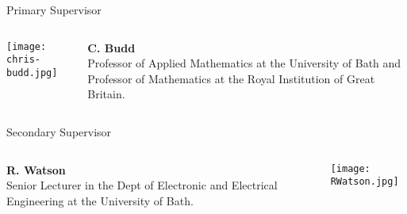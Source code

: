\documentclass[final]{beamer}
\theoremstyle{plain}
\theoremstyle{definition}
\theoremstyle{remark}
\newlength{\onecolwid}
\begin{document}
\begin{frame}[t]
\begin{columns}[t]
\begin{column}{\onecolwid}
\begin{block}{Primary Supervisor}
\vspace{-2cm}
\begin{columns}
\begin{column}{0.25\linewidth}
\texttt{[image: chris-budd.jpg]}
\end{column}
\begin{column}{0.75\linewidth}
\textbf{C. Budd}
 \\
Professor of Applied Mathematics at the University of Bath and Professor of Mathematics at the Royal Institution of Great Britain. \\
\end{column}
\end{columns}
\end{block}

\begin{alertblock}{Secondary Supervisor}
\begin{columns}
\begin{column}{0.75\linewidth}
\textbf{R. Watson}
 \\
Senior Lecturer in the Dept of Electronic and Electrical Engineering at the University of Bath. \\
\end{column}
\begin{column}{0.25\linewidth}
\texttt{[image: RWatson.jpg]}
\end{column}
\end{columns}
\end{alertblock}


\end{column}
\end{columns}
\end{frame}
\end{document}

